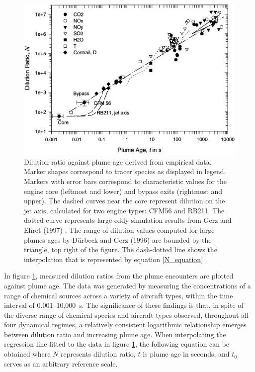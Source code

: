 \begin{figure}[H]
 \centering
 \includegraphics[width=0.8\linewidth]{Schumann_fig.jpg}
 \caption{Dilution ratio against plume age derived from empirical data. Marker shapes correspond to tracer species as displayed in legend. Markers with error bars correspond to characteristic values for the engine core (leftmost and lower) and bypass exits (rightmost and upper). The dashed curves near the core represent dilution on the jet axis, calculated for two engine types: CFM56 and RB211. The dotted curve represents large eddy simulation results from Gerz and Ehret (1997) \cite{Gerz1997}. The range of dilution values computed for large plumes ages by D{\"u}rbeck and Gerz (1996) \cite{Durbeck1996} are bounded by the triangle, top right of the figure. The dash-dotted line shows the interpolation that is represented by equation \eqref{N_equation} \cite{Schumann1998}.}
 \label{Schumann_dilution}
 \end{figure}

In figure \ref{Schumann_dilution}, measured dilution ratios from the plume encounters are plotted against plume age. The data was generated by measuring the concentrations of a range of chemical sources across a variety of aircraft types, within the time interval of 0.001--10,000~s. The significance of these findings is that, in spite of the diverse range of chemical species and aircraft types observed, throughout all four dynamical regimes, a relatively consistent logarithmic relationship emerges between dilution ratio and increasing plume age. When interpolating the regression line fitted to the data in figure \ref{Schumann_dilution}, the following equation can be obtained where $N$ represents dilution ratio, $t$ is plume age in seconds, and $t_0$ serves as an arbitrary reference scale.

